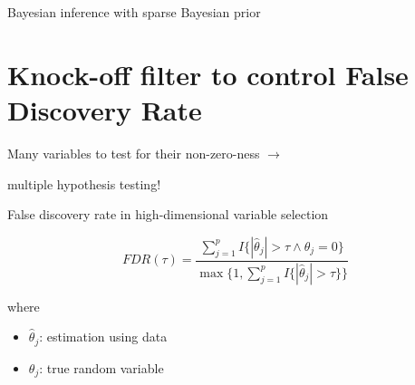 \documentclass[
  ignorenonframetext,
  aspectratio=169]{beamer}
\begin{document}
\begin{frame}{Bayesian inference with sparse Bayesian prior}
\protect\hypertarget{bayesian-inference-with-sparse-bayesian-prior}{}
\scriptsize

\normalsize

\scriptsize


\normalsize

\scriptsize


\normalsize
\end{frame}

\hypertarget{knock-off-filter-to-control-false-discovery-rate}{%
\section{Knock-off filter to control False Discovery
Rate}\label{knock-off-filter-to-control-false-discovery-rate}}

\begin{frame}{}
\protect\hypertarget{section-1}{}
\Large

Many variables to test for their non-zero-ness \(\to\)

\Huge

multiple hypothesis testing!
\end{frame}

\begin{frame}{False discovery rate in high-dimensional variable
selection}
\protect\hypertarget{false-discovery-rate-in-high-dimensional-variable-selection}{}
\Large

\[FDR(\tau) =
\frac{\sum_{j=1}^{p} I\{ |\hat{\theta}_{j}| > \tau \wedge \theta_{j} = 0 \}}
{\max\{1, \sum_{j=1}^{p} I\{ |\hat{\theta}_{j}| > \tau \} \}}\]

\normalsize

where

\begin{itemize}
\item
  \(\hat\theta_{j}\): estimation using data
\item
  \(\theta_{j}\): true random variable
\end{itemize}
\end{frame}
\end{document}
